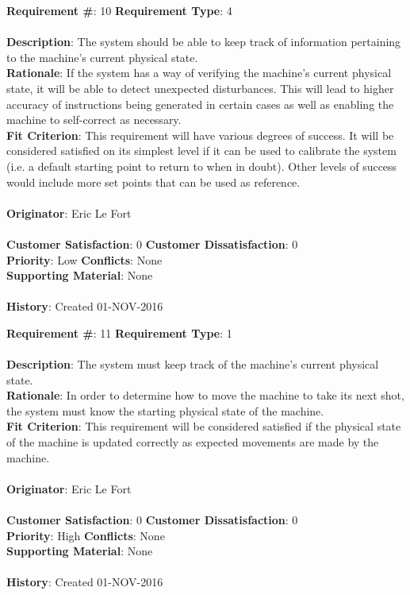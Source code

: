 \documentclass[titlepage]{article}
\begin{document}
\begin{framed}
	\noindent\textbf{Requirement \#}: 10 \hfill \textbf{Requirement Type}: 4 \hfill\\\\
	\noindent\textbf{Description}: The system should be able to keep track of information pertaining to the machine's current physical state.\\
	\textbf{Rationale}: If the system has a way of verifying the machine's current physical state, it will be able to detect unexpected disturbances. This will lead to higher accuracy of instructions being generated in certain cases as well as enabling the machine to self-correct as necessary.\\
	\textbf{Fit Criterion}: This requirement will have various degrees of success. It will be considered satisfied on its simplest level if it can be used to calibrate the system (i.e. a default starting point to return to when in doubt). Other levels of success would include more set points that can be used as reference.\\\\
	\textbf{Originator}: Eric Le Fort\\\\
	\noindent\textbf{Customer Satisfaction}: 0 \hfill 	\textbf{Customer Dissatisfaction}: 0 \hfill\\
	\textbf{Priority}: Low \hfill \textbf{Conflicts}: None \hfill\\
	\textbf{Supporting Material}: None\\\\
	\noindent\textbf{History}: Created 01-NOV-2016
\end{framed}

\begin{framed}
	\noindent\textbf{Requirement \#}: 11 \hfill \textbf{Requirement Type}: 1 \hfill\\\\
	\noindent\textbf{Description}: The system must keep track of the machine's current physical state.\\
	\textbf{Rationale}: In order to determine how to move the machine to take its next shot, the system must know the starting physical state of the machine.\\
	\textbf{Fit Criterion}: This requirement will be considered satisfied if the physical state of the machine is updated correctly as expected movements are made by the machine.\\\\
	\textbf{Originator}: Eric Le Fort\\\\
	\noindent\textbf{Customer Satisfaction}: 0 \hfill 	\textbf{Customer Dissatisfaction}: 0 \hfill\\
	\textbf{Priority}: High \hfill \textbf{Conflicts}: None \hfill\\
	\textbf{Supporting Material}: None\\\\
	\noindent\textbf{History}: Created 01-NOV-2016
\end{framed}
\end{document}
